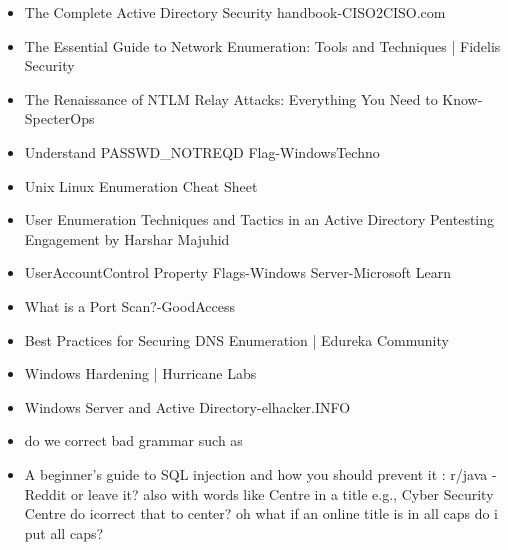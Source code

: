 \begin{itemize}
    \item The Complete Active Directory Security handbook-CISO2CISO.com
    \item The Essential Guide to Network Enumeration: Tools and Techniques | Fidelis Security
    \item The Renaissance of NTLM Relay Attacks: Everything You Need to Know-SpecterOps
    \item Understand PASSWD\_NOTREQD Flag-WindowsTechno
    \item Unix Linux Enumeration Cheat Sheet
    \item User Enumeration Techniques and Tactics in an Active Directory Pentesting Engagement by Harshar Majuhid
    \item UserAccountControl Property Flags-Windows Server-Microsoft Learn
    \item What is a Port Scan?-GoodAccess
    \item Best Practices for Securing DNS Enumeration | Edureka Community
    \item Windows Hardening | Hurricane Labs
    \item Windows Server and Active Directory-elhacker.INFO
    \item 

 
 do we correct bad grammar such as     \item A beginner's guide to SQL injection and how you should prevent it : r/java - Reddit
or leave it? also with words like Centre in a title e.g., Cyber Security Centre do icorrect that to center? oh what if an online title is in all caps do i put all caps?

 

 

 

 

 

 

 
\end{itemize}